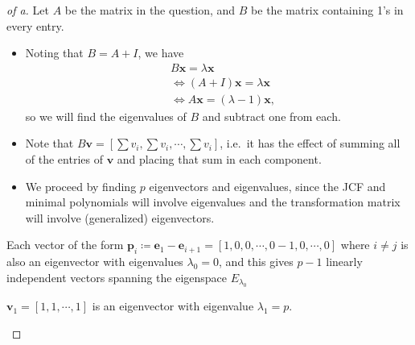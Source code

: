 \begin{solution}

\envlist

\begin{proof}[of a]

Let \(A\) be the matrix in the question, and \(B\) be the matrix
containing 1's in every entry.

\begin{itemize}
\item
  Noting that \(B = A+I\), we have
  \begin{align*}
  &B\mathbf{x} = \lambda \mathbf{x} \\
  &\iff (A+I) \mathbf{x} = \lambda \mathbf{x} \\
  &\iff A \mathbf{x} = (\lambda - 1) \mathbf{x}
  ,\end{align*}
  so we will find the eigenvalues of \(B\) and subtract one from each.
\item
  Note that
  \(B\mathbf{v} = {\left[ {\sum v_i, \sum v_i, \cdots, \sum v_i} \right]}\),
  i.e.~it has the effect of summing all of the entries of \(\mathbf{v}\)
  and placing that sum in each component.
\item
  We proceed by finding \(p\) eigenvectors and eigenvalues, since the
  JCF and minimal polynomials will involve eigenvalues and the
  transformation matrix will involve (generalized) eigenvectors.
\end{itemize}

\begin{claim}[1]

Each vector of the form
\(\mathbf{p}_i \coloneqq\mathbf{e}_1 - \mathbf{e}_{i+1} = {\left[ {1, 0, 0,\cdots, 0 -1, 0, \cdots, 0 } \right]}\)
where \(i\neq j\) is also an eigenvector with eigenvalues
\(\lambda_0 = 0\), and this gives \(p-1\) linearly independent vectors
spanning the eigenspace \(E_{\lambda_0}\)

\end{claim}

\begin{claim}[2]

\(\mathbf{v}_1 = {\left[ {1, 1, \cdots, 1} \right]}\) is an eigenvector
with eigenvalue \(\lambda_1 = p\).

\end{claim}


\end{proof}
\end{solution}
